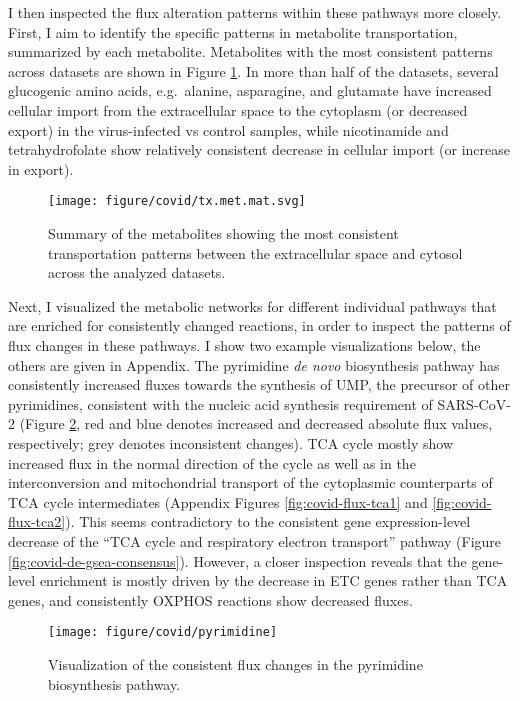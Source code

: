 \documentclass[12pt,twoside,openany,\mydriver]{thesis}  %
\begin{document}
I then inspected the flux alteration patterns within these pathways more closely. First, I aim to identify the specific patterns in metabolite transportation, summarized by each metabolite. Metabolites with the most consistent patterns across datasets are shown in Figure \ref{fig:covid-df-tx-consensus}. In more than half of the datasets, several glucogenic amino acids, e.g.~alanine, asparagine, and glutamate have increased cellular import from the extracellular space to the cytoplasm (or decreased export) in the virus-infected vs control samples, while nicotinamide and tetrahydrofolate show relatively consistent decrease in cellular import (or increase in export).
\begin{figure}
\texttt{[image: figure/covid/tx.met.mat.svg]} \caption{Summary of the metabolites showing the most consistent transportation patterns between the extracellular space and cytosol across the analyzed datasets.}\label{fig:covid-df-tx-consensus}
\end{figure}
Next, I visualized the metabolic networks for different individual pathways that are enriched for consistently changed reactions, in order to inspect the patterns of flux changes in these pathways. I show two example visualizations below, the others are given in Appendix. The pyrimidine \emph{de novo} biosynthesis pathway has consistently increased fluxes towards the synthesis of UMP, the precursor of other pyrimidines, consistent with the nucleic acid synthesis requirement of SARS-CoV-2 (Figure \ref{fig:covid-flux-pyrimidine}, red and blue denotes increased and decreased absolute flux values, respectively; grey denotes inconsistent changes). TCA cycle mostly show increased flux in the normal direction of the cycle as well as in the interconversion and mitochondrial transport of the cytoplasmic counterparts of TCA cycle intermediates (Appendix Figures \ref{fig:covid-flux-tca1} and \ref{fig:covid-flux-tca2}). This seems contradictory to the consistent gene expression-level decrease of the ``TCA cycle and respiratory electron transport'' pathway (Figure \ref{fig:covid-de-gsea-consensus}). However, a closer inspection reveals that the gene-level enrichment is mostly driven by the decrease in ETC genes rather than TCA genes, and consistently OXPHOS reactions show decreased fluxes.
\begin{figure}
\texttt{[image: figure/covid/pyrimidine]} \caption{Visualization of the consistent flux changes in the pyrimidine biosynthesis pathway. }\label{fig:covid-flux-pyrimidine}
\end{figure}
\end{document}
